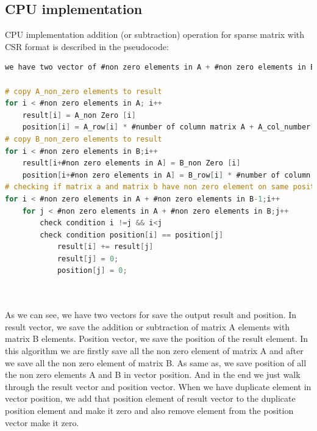 \subsection{CPU implementation}
CPU implementation addition (or subtraction) operation for sparse matrix with CSR format is described in the pseudocode:
\begin{lstlisting}[language=C, caption=matrix addition (or subtraction) in C++]
we have two vector of #non zero elements in A + #non zero elements in B

# copy A_non_zero elements to result
for i < #non zero elements in A; i++
	result[i] = A_non Zero [i]
	position[i] = A_row[i] * #number of column matrix A + A_col_number[i]
# copy B_non_zero elements to result
for i < #non zero elements in B;i++
	result[i+#non zero elements in A] = B_non Zero [i]
	position[i+#non zero elements in A] = B_row[i] * #number of column matrix B + B_col_number[i]
# checking if matrix a and matrix b have non zero element on same position
for i < #non zero elements in A + #non zero elements in B-1;i++
	for j < #non zero elements in A + #non zero elements in B;j++
		check condition i !=j && i<j
		check condition position[i] == position[j]
			result[i] += result[j]
			result[j] = 0;
			position[j] = 0;




\end{lstlisting}
As we can see, we have two vectors for save the output result and position. In result vector, we save the addition or subtraction of matrix A elements with matrix B elements. Position vector, we save the position of the result element. In this algorithm we are firstly save all the non zero element of matrix A and after we save all the non zero element of matrix B. As same as, we save position of all the non zero elements A and B in vector position. And in the end we just walk through the result vector and position vector. When we have duplicate element in vector position, we add that position element of result vector to the duplicate position element and make it zero and also remove element from the position vector make it zero.
